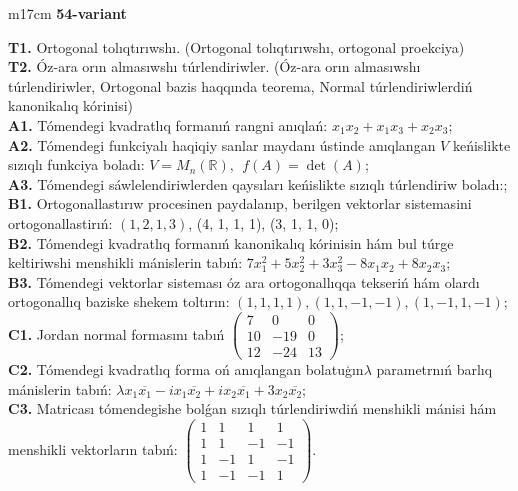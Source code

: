 \documentclass{article}
\begin{document}
\begin{tabular}{m{17cm}}
\textbf{54-variant}
\newline

\textbf{T1.} Ortogonal  tolıqtırıwshı. (Ortogonal tolıqtırıwshı,  ortogonal proekciya) \\
\textbf{T2.} Óz-ara orın almasıwshı túrlendiriwler. (Óz-ara orın almasıwshı túrlendiriwler,  Ortogonal bazis haqqında teorema,  Normal túrlendiriwlerdiń kanonikalıq kórinisi) \\
\textbf{A1.} Tómendegi kvadratlıq formanıń rangni anıqlań: \(x_{1}x_{2} + x_{1}x_{3} + x_{2}x_{3}\); \\
\textbf{A2.} Tómendegi funkciyalı haqiqiy sanlar maydanı ústinde anıqlangan \(V\) keńislikte sızıqlı funkciya boladı: \(V = M_{n}\left( \mathbb{R} \right),\ \ f(A) = \det(A)\); \\
\textbf{A3.} Tómendegi sáwlelendiriwlerden qaysıları keńislikte sızıqlı túrlendiriw boladı:; \\
\textbf{B1.} Ortogonallastırıw procesinen paydalanıp, berilgen vektorlar sistemasini ortogonallastirıń: \((1,2,1,3)\), (4, 1, 1, 1), (3, 1, 1, 0); \\
\textbf{B2.} Tómendegi kvadratlıq formanıń kanonikalıq kórinisin hám bul túrge keltiriwshi menshikli mánislerin tabıń: \(7x_{1}^{2} + 5x_{2}^{2} + 3x_{3}^{2} - 8x_{1}x_{2} + 8x_{2}x_{3}\); \\
\textbf{B3.} Tómendegi vektorlar sisteması óz ara ortogonallıqqa tekseriń hám olardı ortogonallıq baziske shekem toltırın: \((1,1,1,1),(1,1, - 1, - 1),(1, - 1,1, - 1)\); \\
\textbf{C1.} Jordan normal formasını tabıń \(\begin{pmatrix} 7 & 0 & 0 \\ 10 & - 19 & 0 \\ 12 & - 24 & 13 \end{pmatrix}\); \\
\textbf{C2.} Tómendegi kvadratlıq forma oń anıqlangan bolatuģın\(\lambda\) parametrnıń barlıq mánislerin tabıń: \(\lambda x_{1}\overline{x_{1}} - ix_{1}\overline{x_{2}} + ix_{2}\overline{x_{1}} + 3x_{2}\overline{x_{2}}\); \\
\textbf{C3.} Matricası tómendegishe bolǵan sızıqlı túrlendiriwdiń menshikli mánisi hám menshikli vektorların tabıń: \(\begin{pmatrix} 1 & 1 & 1 & 1 \\ 1 & 1 & - 1 & - 1 \\ 1 & - 1 & 1 & - 1 \\ 1 & - 1 & - 1 & 1 \end{pmatrix}\). \\

\end{tabular}
\vspace{1cm}
\end{document}
